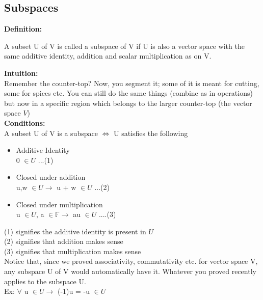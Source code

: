 \documentclass{article}
\begin{document}
\subsection{Subspaces}
\textbf{Definition:}
\begin{center}
    A subset U of V is called a subspace of V if U is also a vector space with the same additive identity, addition and scalar multiplication as on V.
\end{center}
\textbf{Intuition:} \\
Remember the counter-top? Now, you segment it; some of it is meant for cutting, some for spices etc. You can still do the same things (combine as in operations) but now in a specific region which belongs to the larger counter-top (the vector space $V$) \\
\textbf{Conditions:} \\
A subset U of V is a subspace $\iff$ U satisfies the following 
\begin{itemize}
    \item Additive Identity \\
    0 $\in U$            ...(1)
    \item Closed under addition \\
    u,w $\in U \rightarrow$ u + w $\in U$             ...(2)
    \item Closed under multiplication \\ 
    u $\in U$, a $\in \mathbb{F} \rightarrow$ au $\in U$        ....(3)
\end{itemize}
(1) signifies the additive identity is present in $U$ \\
(2) signifies that addition makes sense \\
(3) signifies that multiplication makes sense \\ 
Notice that, since we proved associativity, commutativity etc. for vector space V, any subspace U of V would automatically have it. Whatever you proved recently applies to the subspace U. \\
Ex: $\forall$ u  $\in U \rightarrow$ (-1)u = -u $\in U$ \\
\end{document}

